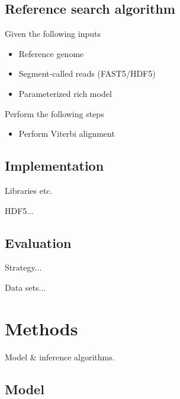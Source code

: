 \documentclass[10pt]{article}
\begin{document}
\subsection{Reference search algorithm}

Given the following inputs
\begin{itemize}
\item Reference genome
\item Segment-called reads (FAST5/HDF5)
\item Parameterized rich model
\end{itemize}

Perform the following steps
\begin{itemize}
\item Perform Viterbi alignment
\end{itemize}

\subsection{Implementation}

Libraries etc.

HDF5...

\subsection{Evaluation}

Strategy...

Data sets...

\section{Methods}

Model \& inference algorithms.

\subsection{Model}
\end{document}
